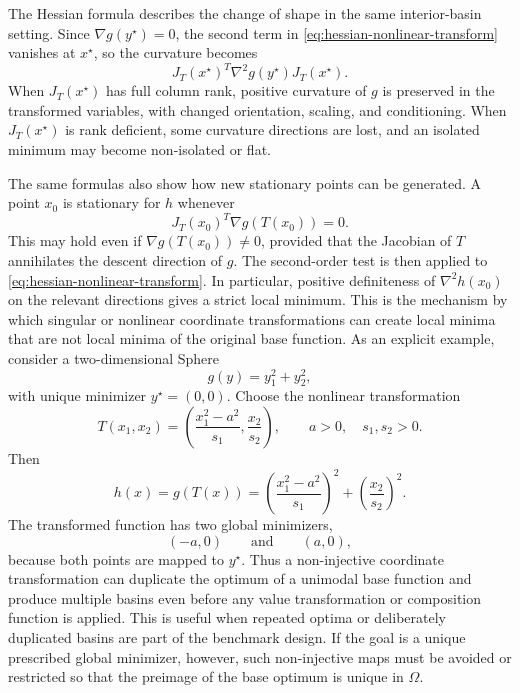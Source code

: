 \documentclass[journal]{IEEEtran}
\theoremstyle{remark}
\theoremstyle{plain}
\begin{document}
The Hessian formula describes the change of shape in the same interior-basin
setting. Since \(\nabla g(y^\star)=0\), the second term in
\eqref{eq:hessian-nonlinear-transform} vanishes at \(x^\star\), so the
curvature becomes
\[
J_T(x^\star)^T\nabla^2 g(y^\star)J_T(x^\star).
\]
When \(J_T(x^\star)\) has full column rank, positive curvature of \(g\) is
preserved in the transformed variables, with changed orientation, scaling, and
conditioning. When \(J_T(x^\star)\) is rank deficient, some curvature directions
are lost, and an isolated minimum may become non-isolated or flat.

The same formulas also show how new stationary points can be generated. A point
\(x_0\) is stationary for \(h\) whenever
\[
J_T(x_0)^T\nabla g(T(x_0))=0.
\]
This may hold even if \(\nabla g(T(x_0))\ne0\), provided that the Jacobian of
\(T\) annihilates the descent direction of \(g\).
The second-order test is then applied to
\eqref{eq:hessian-nonlinear-transform}. In particular, positive definiteness of
\(\nabla^2h(x_0)\) on the relevant directions gives a strict local minimum.
This is the mechanism by which singular or nonlinear coordinate transformations
can create local minima that are not local minima of the original base function.
As an explicit example, consider a two-dimensional Sphere
\[
	g(y)=y_1^2+y_2^2,
\]
with unique minimizer \(y^\star=(0,0)\). Choose the nonlinear transformation
\[
	T(x_1,x_2)
	=
	\left(
	\frac{x_1^2-a^2}{s_1},
	\frac{x_2}{s_2}
	\right),
	\qquad
	a>0,
	\quad s_1,s_2>0.
\]
Then
\[
	h(x)=g(T(x))
	=
	\left(\frac{x_1^2-a^2}{s_1}\right)^2
	+
	\left(\frac{x_2}{s_2}\right)^2.
\]
The transformed function has two global minimizers,
\[
	(-a,0)
	\qquad\text{and}\qquad
	(a,0),
\]
because both points are mapped to \(y^\star\). Thus a non-injective
coordinate transformation can duplicate the optimum of a unimodal base
function and produce multiple basins even before any value transformation or
composition function is applied.
This is useful when repeated optima or deliberately duplicated basins are part
of the benchmark design. If the goal is a unique prescribed global minimizer,
however, such non-injective maps must be avoided or restricted so that the
preimage of the base optimum is unique in \(\Omega\).
\end{document}
